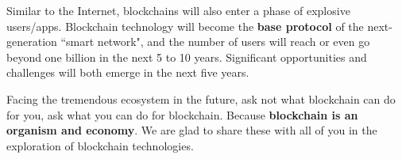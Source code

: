 Similar to the Internet, blockchains will also enter a phase of explosive users/apps. Blockchain technology will become the \textbf{base protocol} of the next-generation ``smart network", and the number of users will reach or even go beyond one billion in the next 5 to 10 years. Significant opportunities and challenges will both emerge in the next five years.


Facing the tremendous ecosystem in the future, ask not what blockchain can do for you, ask what you can do for blockchain. Because \textbf{blockchain is an organism and economy}. We are glad to share these with all of you in the exploration of blockchain technologies.

